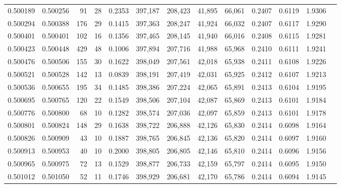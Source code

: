 \begin{tabular}{rrrrrrrrrrrrr}
0.500189 & 0.500256 &    91 &    28 &                                     0.2353 & 397,187 & 208,423 &  41,895 &  66,061 & 0.2407 & 0.6119 & 1.9306 \\
0.500294 & 0.500388 &   176 &    29 &                                     0.1415 & 397,363 & 208,247 &  41,924 &  66,032 & 0.2407 & 0.6117 & 1.9290 \\
0.500401 & 0.500401 &   102 &    16 &                                     0.1356 & 397,465 & 208,145 &  41,940 &  66,016 & 0.2408 & 0.6115 & 1.9281 \\
0.500423 & 0.500448 &   429 &    48 &                                     0.1006 & 397,894 & 207,716 &  41,988 &  65,968 & 0.2410 & 0.6111 & 1.9241 \\
0.500476 & 0.500506 &   155 &    30 &                                     0.1622 & 398,049 & 207,561 &  42,018 &  65,938 & 0.2411 & 0.6108 & 1.9226 \\
0.500521 & 0.500528 &   142 &    13 &                                     0.0839 & 398,191 & 207,419 &  42,031 &  65,925 & 0.2412 & 0.6107 & 1.9213 \\
0.500536 & 0.500655 &   195 &    34 &                                     0.1485 & 398,386 & 207,224 &  42,065 &  65,891 & 0.2413 & 0.6104 & 1.9195 \\
0.500695 & 0.500765 &   120 &    22 &                                     0.1549 & 398,506 & 207,104 &  42,087 &  65,869 & 0.2413 & 0.6101 & 1.9184 \\
0.500776 & 0.500800 &    68 &    10 &                                     0.1282 & 398,574 & 207,036 &  42,097 &  65,859 & 0.2413 & 0.6101 & 1.9178 \\
0.500801 & 0.500824 &   148 &    29 &                                     0.1638 & 398,722 & 206,888 &  42,126 &  65,830 & 0.2414 & 0.6098 & 1.9164 \\
0.500826 & 0.500909 &    43 &    10 &                                     0.1887 & 398,765 & 206,845 &  42,136 &  65,820 & 0.2414 & 0.6097 & 1.9160 \\
0.500913 & 0.500953 &    40 &    10 &                                     0.2000 & 398,805 & 206,805 &  42,146 &  65,810 & 0.2414 & 0.6096 & 1.9156 \\
0.500965 & 0.500975 &    72 &    13 &                                     0.1529 & 398,877 & 206,733 &  42,159 &  65,797 & 0.2414 & 0.6095 & 1.9150 \\
0.501012 & 0.501050 &    52 &    11 &                                     0.1746 & 398,929 & 206,681 &  42,170 &  65,786 & 0.2414 & 0.6094 & 1.9145 \\

\end{tabular}
